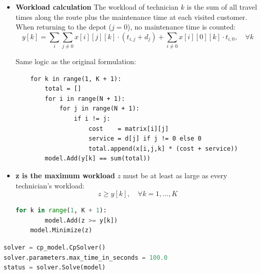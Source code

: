 \documentclass[11pt]{article}
\begin{document}
\begin{itemize}
    The self-loop arcs $(i, i, \text{self\_loop}[i][k])$ are what allow technician $k$'s circuit to skip customer $i$ without breaking the circuit structure:
    $$\text{AddCircuit}\left( \{ (i, i, \text{self\_loop}[i][k]) : i = 1\dots N \} \cup \{ (i, j, x[i][j][k]) : i \neq j \} \right), \quad \forall k = 1,\dots,K$$
    
    \begin{lstlisting}[language=Python]
    for k in range(1, K + 1):
        arcs = []
        for i in range(1, N + 1):
            arcs.append((i, i, self_loop[i, k]))  # skip arc
        for i in range(N + 1):
            for j in range(N + 1):
                if i != j:
                    arcs.append((i, j, x[i, j, k]))
        model.AddCircuit(arcs)
    \end{lstlisting}

    \item \textbf{Workload calculation}\newline
    The workload of technician $k$ is the sum of all travel times along the route plus the maintenance time at each visited customer. When returning to the depot ($j = 0$), no maintenance time is counted:
    $$y[k] = \sum_{i} \sum_{j \neq 0} x[i][j][k] \cdot (t_{i,j} + d_{j}) + \sum_{i \neq 0} x[i][0][k] \cdot t_{i,0}, \quad \forall k$$
    
    \noindent Same logic as the original formulation:
    \begin{lstlisting}
    for k in range(1, K + 1):
        total = []
        for i in range(N + 1):
            for j in range(N + 1):
                if i != j:
                    cost    = matrix[i][j]
                    service = d[j] if j != 0 else 0
                    total.append(x[i,j,k] * (cost + service))
        model.Add(y[k] == sum(total))
    \end{lstlisting}

    \item \textbf{z is the maximum workload}\newline
    $z$ must be at least as large as every technician's workload:
    $$z \ge y[k], \quad \forall k = 1,\dots,K$$
    

    \begin{lstlisting}[language=Python]
    for k in range(1, K + 1):
        model.Add(z >= y[k])
    model.Minimize(z)
    \end{lstlisting}
    
\end{itemize}


\begin{lstlisting}[language=Python]
solver = cp_model.CpSolver()
solver.parameters.max_time_in_seconds = 100.0
status = solver.Solve(model)
\end{lstlisting}
\end{document}
